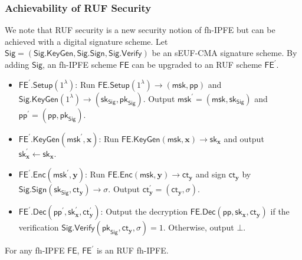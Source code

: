 \subsubsection{Achievability of RUF Security}

We note that RUF security is a new security notion of fh-IPFE but can be achieved with a digital signature scheme. Let $\textsf{Sig} = ( \textsf{Sig.KeyGen}, \textsf{Sig.Sign}, \textsf{Sig.Verify} )$ be an sEUF-CMA signature scheme. By adding $\textsf{Sig}$, an fh-IPFE scheme $\textsf{FE}$ can be upgraded to an RUF scheme $\textsf{FE}^\prime$. 

\begin{itemize}

	\item $\textsf{FE}^\prime \textsf{.Setup}(1^\lambda)$: Run $\textsf{FE.Setup}(1^\lambda) \to (\textsf{msk}, \textsf{pp})$ and $\textsf{Sig.KeyGen}(1^\lambda) \to (\textsf{sk}_{\textsf{Sig}}, \textsf{pk}_{\textsf{Sig}} )$. Output $\textsf{msk}^\prime = (\textsf{msk}, \textsf{sk}_\textsf{Sig})$ and $\textsf{pp}^\prime = (\textsf{pp}, \textsf{pk}_{\textsf{Sig}})$.

	\item $\textsf{FE}^\prime \textsf{.KeyGen}(\textsf{msk}^\prime, \mathbf{x})$: Run $\textsf{FE.KeyGen}(\textsf{msk}, \mathbf{x}) \to \textsf{sk}_{\mathbf{x}}$ and output $\textsf{sk}_{\mathbf{x}}^\prime \gets \textsf{sk}_{\mathbf{x}}$.

	\item $\textsf{FE}^\prime \textsf{.Enc}(\textsf{msk}^\prime, \mathbf{y})$: Run $\textsf{FE.Enc}(\textsf{msk}, \mathbf{y}) \to \textsf{ct}_{\mathbf{y}}$ and sign $\textsf{ct}_{\mathbf{y}}$ by $\textsf{Sig.Sign}(\textsf{sk}_{\textsf{Sig}}, \textsf{ct}_{\mathbf{y}}) \to \sigma$. Output $\textsf{ct}_{\mathbf{y}}^\prime = (\textsf{ct}_{\mathbf{y}}, \sigma)$.

	\item $\textsf{FE}^\prime \textsf{.Dec}(\textsf{pp}^\prime, \textsf{sk}_{\mathbf{x}}^\prime, \textsf{ct}_{\mathbf{y}}^\prime )$: Output the decryption $\textsf{FE.Dec}(\textsf{pp}, \textsf{sk}_{\mathbf{x}}, \textsf{ct}_{\mathbf{y}})$ if the verification $\textsf{Sig.Verify}(\textsf{pk}_{\textsf{Sig}}, \textsf{ct}_{\mathbf{y}}, \sigma ) = 1$. Otherwise, output $\bot$.

\end{itemize}

\begin{theorem}

For any fh-IPFE $\textsf{FE}$, $\textsf{FE}^\prime$ is an RUF fh-IPFE.

\end{theorem}

